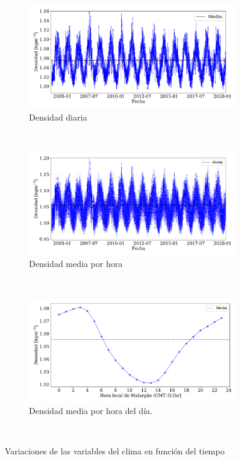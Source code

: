 \begin{figure}[H]
	\centering
        \begin{subfigure}[b]{0.9\textwidth}	
			\includegraphics[width=\textwidth]{Graphs/clima/densidad_diaria.pdf}
			\caption{Densidad diaria}
			\label{fig:densidad_diaria}
        \end{subfigure}\\
        \begin{subfigure}[b]{0.9\textwidth}
			\includegraphics[width=\textwidth]{Graphs/clima/densidad_media_diaria.pdf}
			\caption{Densidad media por hora}
			\label{fig:densidad_hora}
		\end{subfigure}\\
        \begin{subfigure}[b]{0.9\textwidth}	
			\includegraphics[width=\textwidth]{Graphs/clima/densidad_hod.pdf}
			\caption{Densidad media por hora del día.}
			\label{fig:area_auger}
        \end{subfigure}\\
  \caption{Variaciones de las variables del clima en función del tiempo}
  \label{fig:clima_p_rho}
\end{figure}
